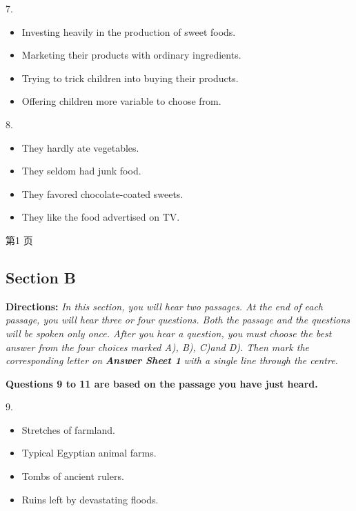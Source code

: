 \documentclass[UTF8,11pt]{ctexart}
\begin{document}
7.


\begin{itemize}[leftmargin=2em,itemsep=.2em,topsep=.4em]\item[A.] Investing heavily in the production of sweet foods.
\item[B.] Marketing their products with ordinary ingredients.
\item[C.] Trying to trick children into buying their products.
\item[D.] Offering children more variable to choose from.
\end{itemize}

8.


\begin{itemize}[leftmargin=2em,itemsep=.2em,topsep=.4em]\item[A.] They hardly ate vegetables.
\item[B.] They seldom had junk food.
\item[C.] They favored chocolate-coated sweets.
\item[D.] They like the food advertised on TV.
\end{itemize}

第1 页


\subsection*{\textbf{Section B}}


\textbf{Directions:}\textit{ In this section, you will hear two passages. At the end of each passage, you will hear three or four} \textit{questions. Both the passage and the questions will be spoken only once. After you hear a question, you must} \textit{choose the best answer from the four choices marked A), B), C)and D). Then mark the corresponding letter on} \textbf{\textit{Answer Sheet 1}}\textit{ with a single line through the centre.}


\textbf{Questions 9 to 11 are based on the passage you have just heard.}


9.


\begin{itemize}[leftmargin=2em,itemsep=.2em,topsep=.4em]\item[A.] Stretches of farmland.
\item[B.] Typical Egyptian animal farms.
\item[C.] Tombs of ancient rulers.
\item[D.] Ruins left by devastating floods.
\end{itemize}
\end{document}
